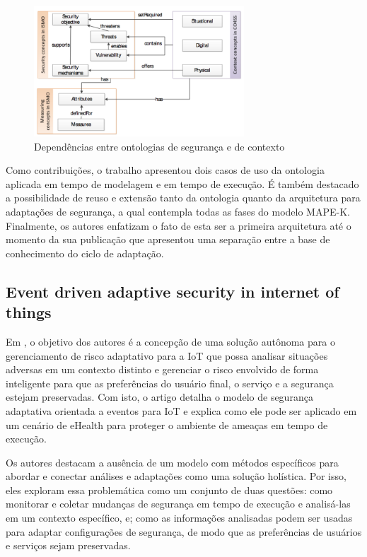 \documentclass[tid,table]{texufpel} %
\begin{document}
\begin{figure}[ht]
\centering
\includegraphics[width=0.7\textwidth]{imagens/ismo-ontology.png}
\caption{Dependências entre ontologias de segurança e de contexto}
\label{ismo-ontology}
\end{figure}


Como contribuições, o trabalho apresentou dois casos de uso da ontologia aplicada em tempo de modelagem e em tempo de execução. É também destacado a possibilidade de reuso e extensão tanto da ontologia quanto da arquitetura para adaptações de segurança, a qual contempla todas as fases do modelo MAPE-K. Finalmente, os autores enfatizam o fato de esta ser a primeira arquitetura até o momento da sua publicação que apresentou uma separação entre a base de conhecimento do ciclo de adaptação. 


\subsection{Event driven adaptive security in internet of things} %

Em \cite{aman14}, o objetivo dos autores é a concepção de uma solução autônoma para o gerenciamento de risco adaptativo para a IoT que possa analisar situações adversas em um contexto distinto e gerenciar o risco envolvido de forma inteligente para que as preferências do usuário final, o serviço e a segurança  estejam preservadas. Com isto, o artigo detalha o modelo de segurança adaptativa orientada a eventos para IoT e explica como ele pode ser aplicado em um cenário de eHealth para proteger o ambiente de ameaças em tempo de execução.

Os autores destacam a ausência de um modelo com métodos específicos para abordar e conectar análises e adaptações como uma solução holística. Por isso, eles exploram essa problemática como um conjunto de duas questões: como monitorar e coletar mudanças de segurança em tempo de execução e analisá-las em um contexto específico, e; como as informações analisadas podem ser usadas para adaptar configurações de segurança, de modo que as preferências de usuários e serviços sejam preservadas.
 
\end{document}
